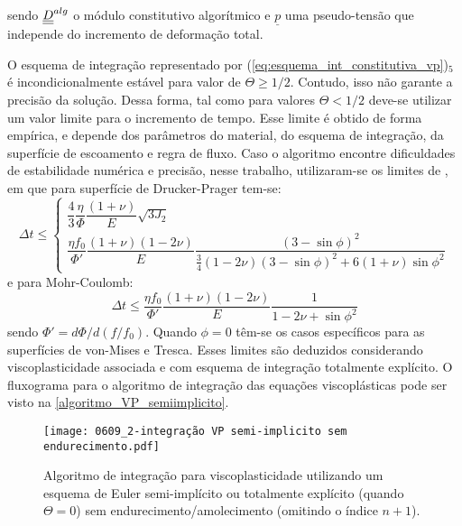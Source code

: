 sendo $\underline{\underline D}^{alg}$ o módulo constitutivo algorítmico e $\underline p$ uma pseudo-tensão que independe do incremento de deformação total.

O esquema de integração representado por (\ref{eq:esquema_int_constitutiva_vp})$_5$ é incondicionalmente estável para valor de $\Theta \geq 1/2$. Contudo, isso não garante a precisão da solução. Dessa forma, tal como para valores $\Theta < 1/2$ deve-se utilizar um valor limite para o incremento de tempo. Esse limite é obtido de forma empírica, e depende dos parâmetros do material, do esquema de integração, da superfície de escoamento e regra de fluxo. Caso o algoritmo encontre dificuldades de estabilidade numérica e precisão, nesse trabalho, utilizaram-se os limites de , em que para superfície de Drucker-Prager tem-se:
\begin{equation}
	\label{eq:deltatmin_dp}
	\Delta t \leq \left\{ 
		\begin{array}{lcl} 
			\dfrac{4}{3}\dfrac{\eta}{\Phi}\dfrac{(1+\nu)}{E} {\sqrt{3J_2}} \\
			\dfrac{\eta f_0}{\Phi'}\dfrac{(1+\nu)(1-2\nu)}{E}\dfrac{(3-\sin{\phi})^2}{\frac{3}{4}(1-2\nu)(3-\sin{\phi})^2 + 6(1+\nu)\sin{\phi}^2}
		\end{array} \right.
\end{equation}
e para Mohr-Coulomb:
\begin{equation}
	\label{eq:deltatmin_mc}
	\Delta t \leq \dfrac{\eta f_0}{\Phi'}\dfrac{(1+\nu)(1-2\nu)}{E}\dfrac{1}{1-2\nu + \sin{\phi}^2}
\end{equation}
sendo $\Phi' = d\Phi / d(f/f_0)$. Quando $\phi = 0$ têm-se os casos específicos para as superfícies de von-Mises e Tresca. Esses limites são deduzidos considerando viscoplasticidade associada e com esquema de integração totalmente explícito. O fluxograma para o algoritmo de integração das equações viscoplásticas pode ser visto na \autoref{algoritmo_VP_semiimplicito}.
\begin{figure}[H]
	\begin{center}
		\texttt{[image: 0609\_2-integração VP semi-implicito sem endurecimento.pdf]}
	\end{center}
	\caption{\label{algoritmo_VP_semiimplicito}Algoritmo de integração para viscoplasticidade utilizando um esquema de Euler semi-implícito ou totalmente explícito (quando $\Theta = 0$) sem endurecimento/amolecimento (omitindo o índice $n+1$).}
\end{figure}

